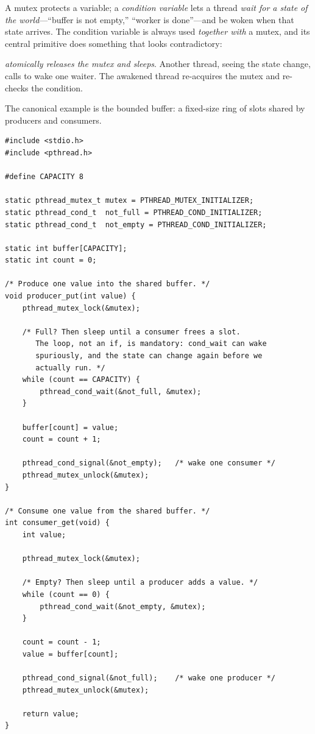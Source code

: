 A mutex protects a variable; a \emph{condition variable} lets a thread
\emph{wait for a state of the world}---``buffer is not empty,''
``worker is done''---and be woken when that state arrives. The
condition variable is always used \emph{together with} a mutex, and
its central primitive does something that looks contradictory:

 \emph{atomically releases the
mutex and sleeps}. Another thread, seeing the state change, calls
 to wake one waiter. The awakened thread
re-acquires the mutex and re-checks the condition.

The canonical example is the bounded buffer: a fixed-size ring of
slots shared by producers and consumers.

\begin{lstlisting}[caption={Producer/consumer with a mutex and condition variables.}]
#include <stdio.h>
#include <pthread.h>

#define CAPACITY 8

static pthread_mutex_t mutex = PTHREAD_MUTEX_INITIALIZER;
static pthread_cond_t  not_full = PTHREAD_COND_INITIALIZER;
static pthread_cond_t  not_empty = PTHREAD_COND_INITIALIZER;

static int buffer[CAPACITY];
static int count = 0;

/* Produce one value into the shared buffer. */
void producer_put(int value) {
    pthread_mutex_lock(&mutex);

    /* Full? Then sleep until a consumer frees a slot.
       The loop, not an if, is mandatory: cond_wait can wake
       spuriously, and the state can change again before we
       actually run. */
    while (count == CAPACITY) {
        pthread_cond_wait(&not_full, &mutex);
    }

    buffer[count] = value;
    count = count + 1;

    pthread_cond_signal(&not_empty);   /* wake one consumer */
    pthread_mutex_unlock(&mutex);
}

/* Consume one value from the shared buffer. */
int consumer_get(void) {
    int value;

    pthread_mutex_lock(&mutex);

    /* Empty? Then sleep until a producer adds a value. */
    while (count == 0) {
        pthread_cond_wait(&not_empty, &mutex);
    }

    count = count - 1;
    value = buffer[count];

    pthread_cond_signal(&not_full);    /* wake one producer */
    pthread_mutex_unlock(&mutex);

    return value;
}
\end{lstlisting}

